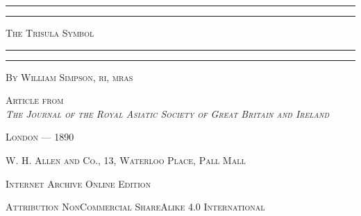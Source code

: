 \documentclass[a4paper, 11pt, oneside, english]{article}
\begin{document}
\begin{titlepage} %
	\centering %


	\rule{\textwidth}{1.6pt}\vspace*{-\baselineskip}\vspace*{2pt} %
	\rule{\textwidth}{0.4pt} %
	
	\vspace{1\baselineskip} %
	
	{\scshape\Huge The Trisula Symbol}
	
	\vspace{1\baselineskip} %

	\rule{\textwidth}{0.4pt}\vspace*{-\baselineskip}\vspace{3.2pt} %
	\rule{\textwidth}{1.6pt} %
	
	\vspace{1\baselineskip} %
	
	
        {\scshape By \Large William Simpson, \small ri, mras}
 
        \vspace{1.0\baselineskip}
		
        {\scshape \scriptsize Article from \\\emph{The Journal of the Royal Asiatic Society of Great Britain and Ireland}} %

        \vspace*{\fill}    

	\vspace{1\baselineskip}

        {\footnotesize\scshape London --- 1890}
	
	{\footnotesize\scshape{W. H. Allen and Co., 13, Waterloo Place, Pall Mall}}
	
	\vspace{0.25\baselineskip} %

        {\scshape\small Internet Archive Online Edition}%
    
	{\scshape\footnotesize Attribution NonCommercial ShareAlike 4.0 International } %
\end{titlepage}
\setlength{\parskip}{1mm plus1mm minus1mm}
\clearpage
\end{document}
